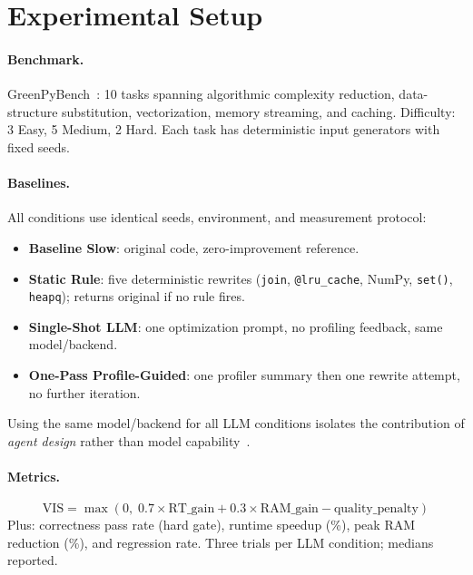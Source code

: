 \documentclass{article}
\begin{document}
\section{Experimental Setup}

\paragraph{Benchmark.} GreenPyBench~\cite{huamani2026greenpybench}: 10 tasks spanning algorithmic complexity reduction, data-structure substitution, vectorization, memory streaming, and caching. Difficulty: 3 Easy, 5 Medium, 2 Hard. Each task has deterministic input generators with fixed seeds.

\paragraph{Baselines.} All conditions use identical seeds, environment, and measurement protocol:
\begin{itemize}[noitemsep,topsep=2pt]
  \item \textbf{Baseline Slow}: original code, zero-improvement reference.
  \item \textbf{Static Rule}: five deterministic rewrites (\texttt{join}, \texttt{@lru\_cache}, NumPy, \texttt{set()}, \texttt{heapq}); returns original if no rule fires.
  \item \textbf{Single-Shot LLM}: one optimization prompt, no profiling feedback, same model/backend.
  \item \textbf{One-Pass Profile-Guided}: one profiler summary then one rewrite attempt, no further iteration.
\end{itemize}
Using the same model/backend for all LLM conditions isolates the contribution of \emph{agent design} rather than model capability~\cite{update3}.

\paragraph{Metrics.}
\begin{equation}
\text{VIS} = \max\!\left(0,\; 0.7\times\text{RT\_gain} + 0.3\times\text{RAM\_gain} - \text{quality\_penalty}\right)
\end{equation}
Plus: correctness pass rate (hard gate), runtime speedup (\%), peak RAM reduction (\%), and regression rate. Three trials per LLM condition; medians reported.
\end{document}
